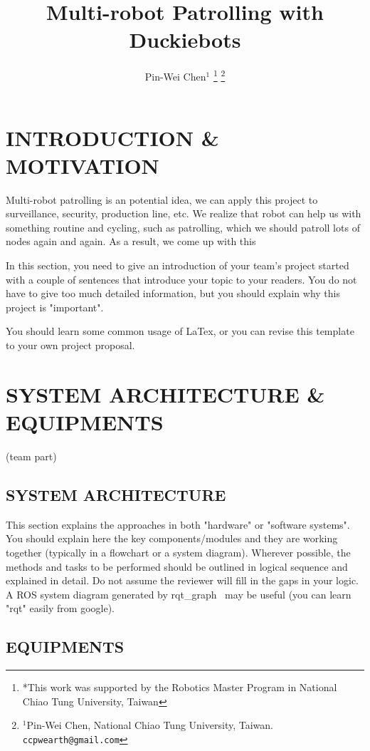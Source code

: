 \documentclass[letterpaper, 10 pt, conference]{ieeeconf}  %
\title{\LARGE \bf
Multi-robot Patrolling with Duckiebots
}
\author{Pin-Wei Chen$^{1}$%
\thanks{*This work was supported by the Robotics Master Program in National Chiao Tung University, Taiwan}%
\thanks{$^{1}$Pin-Wei Chen, National Chiao Tung University, Taiwan.		{\tt\small ccpwearth@gmail.com}}%
}
\begin{document}
\maketitle
\thispagestyle{empty}
\pagestyle{empty}


\section{INTRODUCTION \& MOTIVATION}

Multi-robot patrolling is an potential idea, we can apply this project to surveillance, security, production line, etc. We realize that robot can help us with something routine and cycling, such as patrolling, which we should patroll lots of nodes again and again. As a result, we come up with this 

In this section, you need to give an introduction of your team's project started with a couple of sentences that introduce your topic to your readers. You do not have to give too much detailed information, but you should explain why this project is "important".

You should learn some common usage of LaTex, or you can revise this template to your own project proposal.

\section{SYSTEM ARCHITECTURE \& EQUIPMENTS}

(team part)

\subsection{SYSTEM ARCHITECTURE}

This section explains the approaches in both "hardware" or "software systems". You should explain here the key components/modules and they are working together (typically in a flowchart or a system diagram). Wherever possible, the methods and tasks to be performed should be outlined in logical sequence and explained in detail. Do not assume the reviewer will fill in the gaps in your logic. A ROS system diagram generated by rqt\_graph~\cite{rqt-graph} may be useful (you can learn "rqt" easily from google).

\subsection{EQUIPMENTS} 
\end{document}
